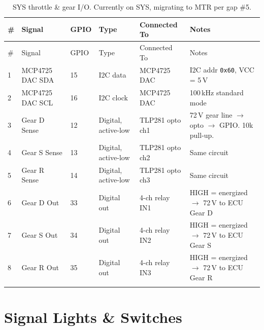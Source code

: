 \documentclass[12pt,a4paper,oneside]{report}
\newcommand{\iicaddr}[1]{\texttt{0x#1}}
\begin{document}
\begin{center}
\begin{longtable}{p{4mm} p{32mm} p{10mm} p{18mm} p{38mm} p{48mm}}
\toprule
\# & Signal & GPIO & Type & Connected To & Notes \\
\midrule
\endfirsthead
\toprule
\# & Signal & GPIO & Type & Connected To & Notes \\
\midrule
\endhead
1 & MCP4725 DAC SDA  & 15 & I2C data  & MCP4725 DAC & I2C addr \iicaddr{60}, VCC = 5\,V \\
2 & MCP4725 DAC SCL  & 16 & I2C clock & MCP4725 DAC & 100\,kHz standard mode \\
3 & Gear D Sense      & 12 & Digital, active-low & TLP281 opto ch1 & 72\,V gear line $\rightarrow$ opto $\rightarrow$ GPIO. 10k pull-up. \\
4 & Gear S Sense      & 13 & Digital, active-low & TLP281 opto ch2 & Same circuit \\
5 & Gear R Sense      & 14 & Digital, active-low & TLP281 opto ch3 & Same circuit \\
6 & Gear D Out        & 33 & Digital out & 4-ch relay IN1 & HIGH = energized $\rightarrow$ 72\,V to ECU Gear D \\
7 & Gear S Out        & 34 & Digital out & 4-ch relay IN2 & HIGH = energized $\rightarrow$ 72\,V to ECU Gear S \\
8 & Gear R Out        & 35 & Digital out & 4-ch relay IN3 & HIGH = energized $\rightarrow$ 72\,V to ECU Gear R \\
\bottomrule
\caption{SYS throttle \& gear I/O. Currently on SYS, migrating to MTR per gap \#5.}
\end{longtable}
\end{center}

\section{Signal Lights \& Switches}
\end{document}
